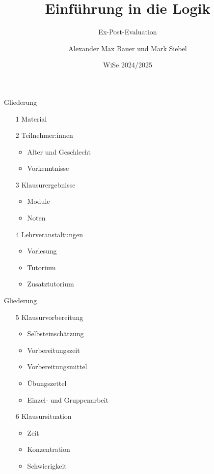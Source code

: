 \documentclass[xcolor=table,9pt,aspectratio=169]{beamer}
\title{Einführung in die Logik}
\subtitle{Ex-Post-Evaluation}
\author{Alexander Max Bauer und Mark Siebel}
\date{WiSe 2024/2025}
\begin{document}
{
\begin{frame}
   \maketitle
\end{frame}
}


\begin{frame}{\vspace*{10mm}Gliederung}
\begin{itemize}
   \item[1] Material
   \item[2] Teilnehmer:innen
   \begin{itemize}
      \item Alter und Geschlecht
      \item Vorkenntnisse
   \end{itemize}
   \item[3] Klausurergebnisse
   \begin{itemize}
      \item Module
      \item Noten
   \end{itemize}
   \item[4] Lehrveranstaltungen
   \begin{itemize}
      \item Vorlesung
      \item Tutorium
      \item Zusatztutorium
   \end{itemize}
\end{itemize}
\end{frame}


\begin{frame}{\vspace*{10mm}Gliederung}
\begin{itemize}
   \item[5] Klausurvorbereitung
   \begin{itemize}
      \item Selbsteinschätzung
      \item Vorbereitungszeit
      \item Vorbereitungsmittel
      \item Übungszettel
      \item Einzel- und Gruppenarbeit
   \end{itemize}
   \item[6] Klausursituation
   \begin{itemize}
      \item Zeit
      \item Konzentration
      \item Schwierigkeit
   \end{itemize}
\end{itemize}
\end{frame}
\end{document}
